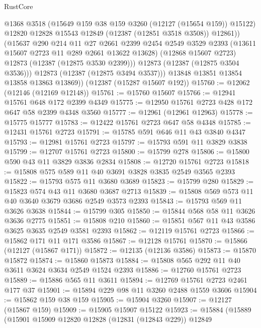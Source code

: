 \begin{lexlean}{RustCore}
\begin{coremodule}
                @1368
                @3518
                (@15649 @159 @38 @159 @3260 (@12127 (@15654 @159)) @15122)
                @12820
                @12828
                @15543
                @12849
                (@12387 (@12851 @3518 @3508))
                @12861))
            (@15637
              @290
              @214
              @11
              @27
              @2661
              @2399
              @2454
              @2549
              @3529
              @2393
              (@13611 @15607 @2723 @11 @289 @2661 @13622 @13628)
              (@12868 @15607 @2723)
              @12873
              (@12387 (@12875 @3530 @2399)))
            @12873
            (@12387 (@12875 @3504 @3536)))
          @12873
          (@12387 (@12875 @3494 @3537)))
        @13848
        @13851
        @13854
        @13858
        @13863
        @13869))
    (@12387 (@15287 @15607 @192))
@15760 := @12062 (@12146 (@12169 @12148))
@15761 := @15760 @15607
@15766 := @12941 @15761 @648 @172 @2399 @4349
@15775 := @12950 @15761 @2723 @428 @172 @647 @58 @2399 @4348 @3560
@15777 := @12961 (@12961 @12963)
@15778 := @15775 @15777
@15783 := @12422 @15761 @2723 @647 @58 @4348
@15785 := @12431 @15761 @2723
@15791 := @15785 @591 @646 @11 @43 @3840 @4347
@15793 := @12981 @15761 @2723
@15797 := @15793 @591 @11 @3829 @3838
@15799 := @12707 @15761 @2723
@15800 := @15799 @278
@15806 := @15800 @590 @43 @11 @3829 @3836 @2834
@15808 := @12720 @15761 @2723
@15818 := @15808 @575 @589 @11 @40 @3691 @3828 @3835 @2549 @3565 @2393
@15822 := @15793 @575 @11 @3680 @3689
@15823 := @15799 @280
@15829 := @15823 @574 @43 @11 @3680 @3687 @2713
@15839 := @15808 @569 @573 @11 @40 @3640 @3679 @3686 @2549 @3573 @2393
@15843 := @15793 @569 @11 @3626 @3638
@15844 := @15799 @305
@15850 := @15844 @568 @58 @11 @3626 @3636 @2775
@15851 := @15808 @210
@15860 := @15851 @567 @11 @43 @3586 @3625 @3635 @2549 @3581 @2393
@15862 := @12119 @15761 @2723
@15866 := @15862 @171 @11 @171 @3586
@15867 := @12128 @15761
@15870 := @15866 (@12127 (@15867 @171))
@15872 := @12135 (@12136 @3586)
@15873 := @15870 @15872
@15874 := @15860 @15873
@15884 := @15808 @565 @292 @11 @40 @3611 @3624 @3634 @2549 @1524 @2393
@15886 := @12760 @15761 @2723
@15889 := @15886 @565 @11 @3611
@15894 := @12769 @15761 @2723 @2461 @177 @37
@15901 := @15894 @229 @98 @11 @3260 @2488 @1559 @3606
@15904 := @15862 @159 @38 @159
@15905 := @15904 @3260
@15907 := @12127 (@15867 @159)
@15909 := @15905 @15907 @15122
@15923 := @15884
    (@15889
      (@15901
        @15909
        @12820
        @12828
        (@12831 (@12843 @229))
        @12849

\end{coremodule}
\end{lexlean}
